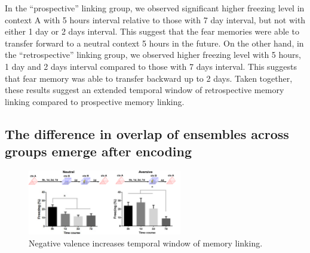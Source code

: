 \documentclass[master.tex]{subfiles}
\begin{document}
In the ``prospective'' linking group, we observed significant higher freezing
level in context A with 5 hours interval relative to those with 7 day interval,
but not with either 1 day or 2 days interval. This suggest that the fear
memories were able to transfer forward to a neutral context 5 hours in the
future. On the other hand, in the ``retrospective'' linking group, we observed
higher freezing level with 5 hours, 1 day and 2 days interval compared to those
with 7 days interval. This suggests that fear memory was able to transfer
backward up to 2 days. Taken together, these results suggest an extended
temporal window of retrospective memory linking compared to prospective memory
linking.

\subsection*{The difference in overlap of ensembles across groups emerge after
  encoding}

\begin{figure}
  \centering \includegraphics[width =
  0.6\textwidth]{Figures/val_retro_prelim.pdf}
  \caption{\footnotesize Negative valence increases temporal window of memory
    linking.}
  \label{fig:prelim_val}
\end{figure}
\end{document}
